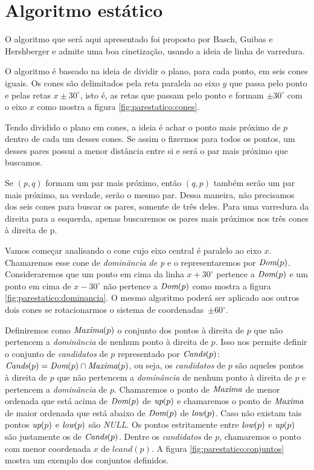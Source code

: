 
\FloatBarrier
\section{Algoritmo estático}

O algoritmo que será aqui apresentado foi proposto por Basch, Guibas
e Hershberger e admite uma boa cinetização, usando a ideia de linha
de varredura.

O algoritmo é baseado na ideia de dividir o plano, para cada ponto,
em seis cones iguais. Os cones são delimitados pela reta paralela ao
eixo $y$ que passa pelo ponto e pelas retas $x \pm 30^\circ$, isto
é, as retas que passam pelo ponto e formam $\pm 30^\circ$ com o eixo
$x$ como mostra a figura \ref{fig:parestatico:cones}.



Tendo dividido o plano em cones, a ideia é achar o ponto mais
próximo de $p$ dentro de cada um desses cones. Se assim o fizermos
para todos os pontos, um desses pares possui a menor distância entre
si e será o par mais próximo que buscamos.

Se $(p, q)$ formam um par mais próximo, então $(q, p)$ também serão
um par mais próximo, na verdade, serão o mesmo par. Dessa maneira,
não precisamos dos seis cones para buscar os pares, somente de três
deles. Para uma varredura da direita para a esquerda, apenas
buscaremos os pares mais próximos nos três cones à direita de p.

Vamos começar analisando o cone cujo eixo central é paralelo ao eixo
$x$. Chamaremos esse cone de \textit{dominância de p} e o
representaremos por $\textit{Dom}(p)$. Consideraremos que um ponto em cima
da linha $x + 30^\circ$ pertence a $\textit{Dom}(p)$ e um ponto em cima de
$x - 30^\circ$ não pertence a $\textit{Dom}(p)$ como mostra a figura
\ref{fig:parestatico:dominancia}. O mesmo algoritmo poderá ser
aplicado aos outros dois cones se rotacionarmos o sistema de
coordenadas~$\pm 60^\circ$.



Definiremos como $\textit{Maxima}(p)$ o conjunto dos pontos à direita de $p$
que não pertencem a \textit{dominância} de nenhum ponto à direita de
$p$. Isso nos permite definir o conjunto de \textit{candidatos} de
$p$ representado por $\textit{Cands}(p)$: $\textit{Cands}(p) = \textit{Dom}(p) \cap
\textit{Maxima}(p)$, ou seja, os \textit{candidatos} de $p$ são aqueles
pontos à direita de $p$ que não pertencem a \textit{dominância} de
nenhum ponto à direita de $p$ e pertencem a \textit{dominância} de
$p$. Chamaremos o ponto de $\textit{Maxima}$ de menor ordenada que está
acima de $\textit{Dom}(p)$ de $\textit{up}(p)$ e chamaremos o ponto de $\textit{Maxima}$ de
maior ordenada que está abaixo de $\textit{Dom}(p)$ de $\textit{low}(p)$. Caso não
existam tais pontos $\textit{up}(p)$ e $\textit{low}(p)$ são \textit{NULL}. Os
pontos estritamente entre $\textit{low}(p)$ e $\textit{up}(p)$ são justamente os de
$\textit{Cands}(p)$. Dentre os \textit{candidatos} de $p$, chamaremos o
ponto com menor coordenada $x$ de $lcand(p)$. A figura
\ref{fig:parestatico:conjuntos}
mostra um exemplo dos conjuntos definidos.

